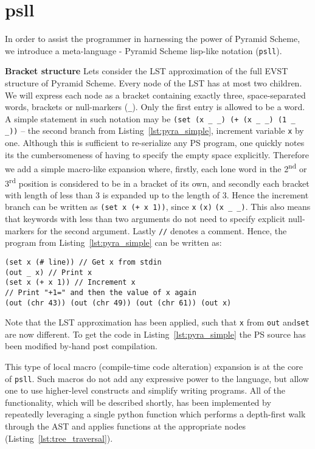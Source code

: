 \documentclass[aip,jcp,reprint,footinbib]{revtex4-1}
\let\tt\texttt
\newcommand\psll{\texttt{psll}\xspace}
\newcommand{\ilpsll}[1]{\lstinline[language=psll,columns=flexible]{#1}}
\begin{document}
\section{psll}

In order to assist the programmer in harnessing the power of Pyramid Scheme, we introduce a meta-language - Pyramid Scheme lisp-like notation (\psll).

\textbf{Bracket structure} Lets consider the LST approximation of the full EVST structure of Pyramid Scheme. Every node of the LST has at most two children. We will express each node as a bracket containing exactly three, space-separated words, brackets or null-markers (\ilpsll{_}). Only the first entry is allowed to be a word. A simple statement in such notation may be \ilpsll{(set (x _ _) (+ (x _ _) (1 _ _))} -- the second branch from Listing~\ref{lst:pyra_simple}, increment variable \tt{x} by one. Although this is sufficient to re-serialize any PS program, one quickly notes its the cumbersomeness of having to specify the empty space explicitly. Therefore we add a simple macro-like expansion where, firstly, each lone word in the 2\textsuperscript{nd} or 3\textsuperscript{rd} position is considered to be in a bracket of its own, and secondly each bracket with length of less than 3 is expanded up to the length of 3. Hence the increment branch can be written as \ilpsll{(set x (+ x 1))}, since \ilpsll{x} \textrightarrow \ilpsll{(x)} \textrightarrow \ilpsll{(x _ _)}. This also means that keywords with less than two arguments do not need to specify explicit null-markers for the second argument. Lastly \tt{//} denotes a comment. Hence, the program from Listing~\ref{lst:pyra_simple} can be written as:
\begin{lstlisting}[language=psll,
    label=lst:psll_simple, caption={
    LST approximation of the program from Listing~\ref{lst:pyra_simple} in simple \psll notation.
}]
(set x (# line)) // Get x from stdin
(out _ x) // Print x
(set x (+ x 1)) // Increment x
// Print "+1=" and then the value of x again
(out (chr 43)) (out (chr 49)) (out (chr 61)) (out x)
\end{lstlisting}
Note that the LST approximation has been applied, such that \tt{x} from \tt{out} and\tt{set} are now different. To get the code in Listing~\ref{lst:pyra_simple} the PS source has been modified by-hand post compilation.

This type of local macro (compile-time code alteration) expansion is at the core of \psll. Such macros do not add any expressive power to the language,\cite{krishnamurthi2019} but allow one to use higher-level constructs and simplify writing programs. All of the functionality, which will be described shortly, has been implemented by repeatedly leveraging a single python function which performs a depth-first walk through the AST and applies functions at the appropriate nodes (Listing~\ref{lst:tree_traversal}).
\end{document}
